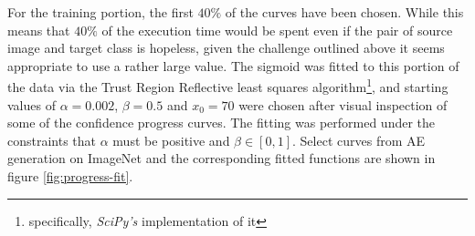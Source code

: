\documentclass[11pt, a4paper]{article}
\newcommand\brackets[1]{\left[#1\right]}
\begin{document}
For the training portion, the first $40\%$ of the curves have been chosen. While this means that $40\%$ of the execution time would be spent even if the pair of source image and target class is hopeless, given the challenge outlined above it seems appropriate to use a rather large value. The sigmoid was fitted to this portion of the data via the Trust Region Reflective least squares algorithm\footnote{specifically, \emph{SciPy's} implementation of it}, and starting values of $\alpha = 0.002$, $\beta = 0.5$ and $x_0 = 70$ were chosen after visual inspection of some of the confidence progress curves. The fitting was performed under the constraints that $\alpha$ must be positive and $\beta \in \brackets{0, 1}$. Select curves from AE generation on ImageNet and the corresponding fitted functions are shown in figure \ref{fig:progress-fit}.
\end{document}
